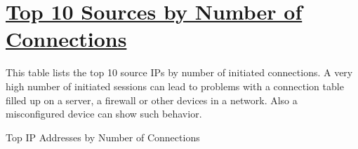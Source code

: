 %
%
%

\chapter[Top 10 Sources by Number of Connections]{\underline{Top 10 Sources by Number of Connections}}
\begin{flushleft}
This table lists the top 10 source IPs by number of initiated connections. A very high number of initiated sessions can lead to problems with a connection table filled up on a server, a firewall or other devices in a network. Also a misconfigured device can show such behavior.
\end{flushleft}

\begin{table}[H]
  \begin{center}
    \caption[\normalsize{Top IP Addresses by Number of Connections}]{\small{Top IP Addresses by Number of Connections}}
  \end{center}
\end{table}

